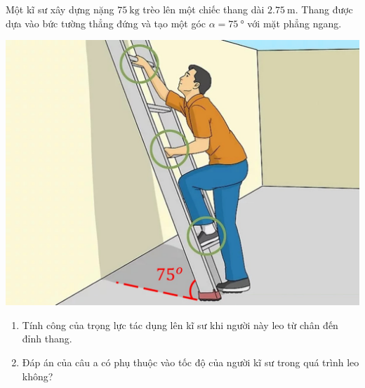 \begin{ex}
	Một kĩ sư xây dựng nặng $\SI{75}{\kilogram}$ trèo lên một chiếc thang dài $\SI{2.75}{\meter}$. Thang được dựa vào bức tường thẳng đứng và tạo một góc $\alpha=\SI{75}{\degree}$ với mặt phẳng ngang.
	\begin{center}
		\includegraphics[width=0.4\linewidth]{../figs/VN10-2023-PH-TP024-P-3}
	\end{center}
	\begin{enumerate}[label=\alph*)]
		\item Tính công của trọng lực tác dụng lên kĩ sư khi người này leo từ chân đến đỉnh thang.
		\item Đáp án của câu a có phụ thuộc vào tốc độ của người kĩ sư trong quá trình leo không?
	\end{enumerate}
\end{ex}
